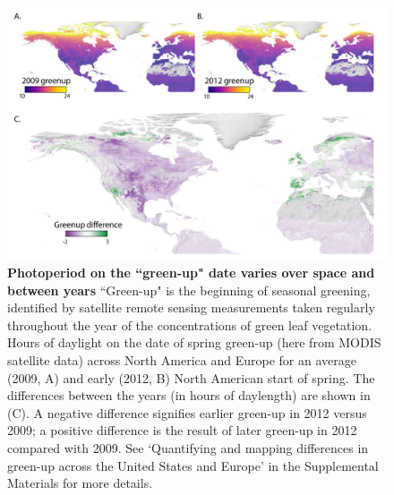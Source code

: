 \documentclass{article}
\begin{document}
 \begin{figure}[p]
\centering
\includegraphics{..//..//docs/photoperiod/figures/Greenup_corr_lets.pdf} %
\caption{\textbf{Photoperiod on the ``green-up" date varies over space and between years} ``Green-up" is the beginning of seasonal greening, identified by satellite remote sensing measurements taken regularly throughout the year of the concentrations of green leaf vegetation. Hours of daylight on the date of spring green-up (here from MODIS satellite data) across North America and Europe for an average (2009, A) and  early (2012, B) North American start of spring. The differences between the years (in hours of daylength) are shown in (C). A negative difference signifies earlier green-up in 2012 versus 2009; a positive difference is the result of later green-up in 2012 compared with 2009. See `Quantifying and mapping differences in green-up across the United States and Europe' in the Supplemental Materials for more details. }%
 \label{fig:greenup}%
 \end{figure}
 
\end{document}
